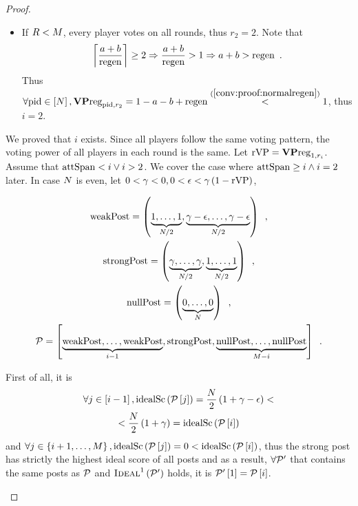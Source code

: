 \begin{proof}
\begin{itemize}
\begin{itemize}
      \item If $R < M$, every player votes on all rounds, thus $r_2
      = 2$. Note that
      \begin{equation}
        \label{conv:proof:normalregen}
        \ceil*{\frac{a + b}{\regen}} \geq 2 \Rightarrow \frac{a + b}{\regen} >
        1 \Rightarrow a + b > \regen\enspace.
      \end{equation}
      Thus $\forall \mathrm{pid} \in \left[N\right], \mathrm{\textbf{VP}reg}_{\mathrm{pid}, r_2}
      = 1 - a - b + \mathrm{regen} \overset{(\ref{conv:proof:normalregen})}{<} 1$, thus
      $i = 2$.
    \end{itemize}
    We proved that $i$ exists. Since all players follow the same voting pattern,
    the voting power of all players in each round is the same. Let $\mathrm{rVP} =
    \mathrm{\textbf{VP}reg}_{1, r_i}$. Assume that $\mathrm{attSpan} < i \vee i > 2$. We
    cover the case where $\mathrm{attSpan} \geq i \wedge i = 2$ later. In case
    $N$ is even, let $0 < \gamma < 0, 0 < \epsilon < \gamma\left(1 -
    \mathrm{rVP}\right)$,

    \begin{gather*}
      \mathrm{weakPost} = \left(\underbrace{1, \dots, 1}_{N/2},
      \underbrace{\gamma - \epsilon, \dots, \gamma -
      \epsilon}_{N/2}\right) \enspace, \\
      \mathrm{strongPost} = \left(\underbrace{\gamma, \dots, \gamma}_{N/2},
      \underbrace{1, \dots, 1}_{N/2}\right) \enspace, \\
      \mathrm{nullPost} = \left(\underbrace{0, \dots, 0}_{N}\right) \enspace,
      \\
      \mathcal{P} = \left[\underbrace{\mathrm{weakPost}, \dots, \mathrm{weakPost}}_{i - 1},
      \mathrm{strongPost}, \underbrace{\mathrm{nullPost}, \dots, \mathrm{nullPost}}_{M -
      i}\right] \enspace.
    \end{gather*}

    First of all, it is
    \begin{gather*}
      \forall j \in \left[i - 1\right], \mathrm{idealSc}\left(\mathcal{P}\left[j\right]\right) =
      \frac{N}{2}\left(1 + \gamma - \epsilon\right) < \\
      < \frac{N}{2}\left(1 + \gamma\right) =
      \mathrm{idealSc}\left(\mathcal{P}\left[i\right]\right)
    \end{gather*}
    and $\forall j \in \left\{i + 1, \dots,
    M\right\}, \mathrm{idealSc}\left(\mathcal{P}\left[j\right]\right) = 0 <
    \mathrm{idealSc}\left(\mathcal{P}\left[i\right]\right)$, thus the strong post has strictly the
    highest ideal score of all posts and as a result, $\forall \mathcal{P}'$ that
    contains the same posts as $\mathcal{P}$ and
    $\textsc{Ideal}^1\left(\mathcal{P}'\right)$ holds, it is
    $\mathcal{P}'\left[1\right] = \mathcal{P}\left[i\right]$.


\end{itemize}
\end{proof}

